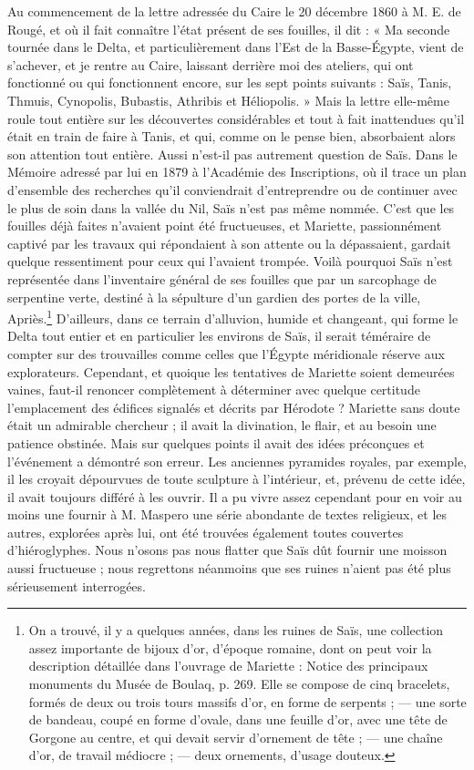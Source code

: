 \documentclass[letterpaper,twocolumn,openany,nodeprecatedcode]{dndbook}
\begin{document}
Au commencement de la lettre adressée du Caire le 20 décembre 1860 à M. E. de Rougé, et où il fait connaître l'état présent de ses fouilles, il dit : « Ma seconde tournée dans le Delta, et particulièrement dans l'Est de la Basse-Égypte, vient de s'achever, et je rentre au Caire, laissant derrière moi des ateliers, qui ont fonctionné ou qui fonctionnent encore, sur les sept points suivants : Saïs, Tanis, Thmuis, Cynopolis, Bubastis, Athribis et Héliopolis. » Mais la lettre elle-même roule tout entière sur les découvertes considérables et tout à fait inattendues qu'il était en train de faire à Tanis, et qui, comme on le pense bien, absorbaient alors son attention tout entière. Aussi n'est-il pas autrement question de Saïs. Dans le Mémoire adressé par lui en 1879 à l'Académie des Inscriptions, où il trace un plan d'ensemble des recherches qu'il conviendrait d'entreprendre ou de continuer avec le plus de soin dans la vallée du Nil, Saïs n'est pas même nommée. C'est que les fouilles déjà faites n'avaient point été fructueuses, et Mariette, passionnément captivé par les travaux qui répondaient à son attente ou la dépassaient, gardait quelque ressentiment pour ceux qui l'avaient trompée. Voilà pourquoi Saïs n'est représentée dans l'inventaire général de ses fouilles que par un sarcophage de serpentine verte, destiné à la sépulture d'un gardien des portes de la ville, Apriès.\footnote{On a trouvé, il y a quelques années, dans les ruines de Saïs, une collection assez importante de bijoux d'or, d'époque romaine, dont on peut voir la description détaillée dans l'ouvrage de Mariette : Notice des principaux monuments du Musée de Boulaq, p. 269. Elle se compose de cinq bracelets, formés de deux ou trois tours massifs d'or, en forme de serpents ; --- une sorte de bandeau, coupé en forme d'ovale, dans une feuille d'or, avec une tête de Gorgone au centre, et qui devait servir d'ornement de tête ; --- une chaîne d'or, de travail médiocre ; --- deux ornements, d'usage douteux.} D'ailleurs, dans ce terrain d'alluvion, humide et changeant, qui forme le Delta tout entier et en particulier les environs de Saïs, il serait téméraire de compter sur des trouvailles comme celles que l'Égypte méridionale réserve aux explorateurs. Cependant, et quoique les tentatives de Mariette soient demeurées vaines, faut-il renoncer complètement à déterminer avec quelque certitude l'emplacement des édifices signalés et décrits par Hérodote ? Mariette sans doute était un admirable chercheur ; il avait la divination, le flair, et au besoin une patience obstinée. Mais sur quelques points il avait des idées préconçues et l'événement a démontré son erreur. Les anciennes pyramides royales, par exemple, il les croyait dépourvues de toute sculpture à l'intérieur, et, prévenu de cette idée, il avait toujours différé à les ouvrir. Il a pu vivre assez cependant pour en voir au moins une fournir à M. Maspero une série abondante de textes religieux, et les autres, explorées après lui, ont été trouvées également toutes couvertes d'hiéroglyphes. Nous n'osons pas nous flatter que Saïs dût fournir une moisson aussi fructueuse ; nous regrettons néanmoins que ses ruines n'aient pas été plus sérieusement interrogées.
\end{document}
